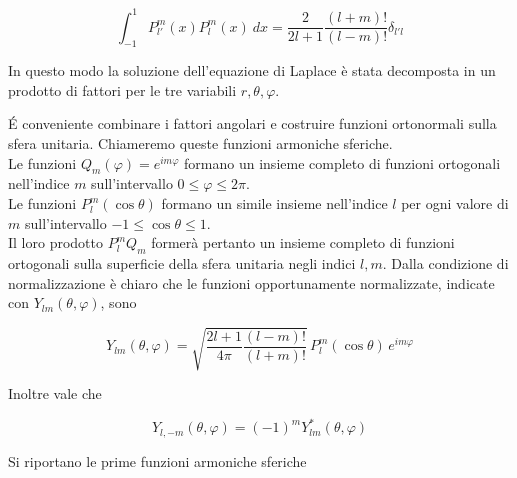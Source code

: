 \begin{tcolorbox}[colback=yellow!10!white, colframe=orange!70!black, boxrule=0.8pt]
\begin{equation}
    \int_{-1} ^1 P_{l'}^m (x) P_l ^m (x) \ dx = \frac{2}{2l +1} \frac{(l+m)!}{(l-m)!} \delta_{l'l}
\end{equation}
\end{tcolorbox}

In questo modo la soluzione dell'equazione di Laplace è stata decomposta in un prodotto di fattori per le tre variabili $r, \theta, \varphi$. \\

\newpage

\' E conveniente combinare i fattori  angolari e costruire funzioni ortonormali sulla sfera unitaria. Chiameremo queste funzioni armoniche sferiche. \\

Le funzioni \(Q_m(\varphi) = e^{im\varphi}\) formano un insieme completo di funzioni ortogonali nell’indice \(m\) sull’intervallo \(0 \le \varphi \le 2\pi\). \\
Le funzioni \(P_l^m(\cos\theta)\) formano un simile insieme nell’indice \(l\) per ogni valore di \(m\) sull’intervallo \(-1 \le \cos\theta \le 1\). \\

Il loro prodotto \(P_l^m Q_m\) formerà pertanto un insieme completo di funzioni ortogonali sulla superficie della sfera unitaria negli indici \(l, m\). 
Dalla condizione di normalizzazione è chiaro che le funzioni opportunamente normalizzate, indicate con \(Y_{lm}(\theta,\varphi)\), sono

\begin{tcolorbox}[colback=yellow!10!white, colframe=orange!70!black, boxrule=0.8pt]
\begin{equation}
Y_{lm}(\theta,\varphi)
= \sqrt{\frac{2l+1}{4\pi} \frac{(l-m)!}{(l+m)!}}\, P_l^m(\cos\theta)\, e^{im\varphi}
\end{equation}
\end{tcolorbox}

Inoltre vale che 

\begin{equation}
    Y_{l,-m}(\theta, \varphi) = (-1)^m Y_{lm}^* (\theta, \varphi)
\end{equation}

Si riportano le prime funzioni armoniche sferiche 


